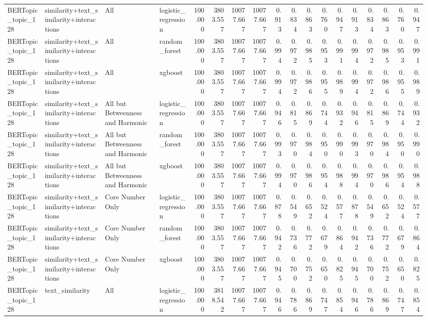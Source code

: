 \begin{tabular}{llllrrrrrrrrrrrrrr}
BERTopic_topic_128 & similarity+text_similarity+interactions & All & logistic_regression & 100.000 & 3803.557 & 10077.667 & 10077.667 & 0.913 & 0.834 & 0.863 & 0.760 & 0.947 & 0.913 & 0.834 & 0.863 & 0.760 & 0.947 \\
BERTopic_topic_128 & similarity+text_similarity+interactions & All & random_forest & 100.000 & 3803.557 & 10077.667 & 10077.667 & 0.994 & 0.972 & 0.985 & 0.953 & 0.991 & 0.994 & 0.972 & 0.985 & 0.953 & 0.991 \\
BERTopic_topic_128 & similarity+text_similarity+interactions & All & xgboost & 100.000 & 3803.557 & 10077.667 & 10077.667 & 0.994 & 0.972 & 0.986 & 0.955 & 0.989 & 0.994 & 0.972 & 0.986 & 0.955 & 0.989 \\
BERTopic_topic_128 & similarity+text_similarity+interactions & All but Betweenness and Harmonic & logistic_regression & 100.000 & 3803.557 & 10077.667 & 10077.667 & 0.946 & 0.815 & 0.869 & 0.744 & 0.932 & 0.946 & 0.815 & 0.869 & 0.744 & 0.932 \\
BERTopic_topic_128 & similarity+text_similarity+interactions & All but Betweenness and Harmonic & random_forest & 100.000 & 3803.557 & 10077.667 & 10077.667 & 0.993 & 0.970 & 0.984 & 0.950 & 0.990 & 0.993 & 0.970 & 0.984 & 0.950 & 0.990 \\
BERTopic_topic_128 & similarity+text_similarity+interactions & All but Betweenness and Harmonic & xgboost & 100.000 & 3803.557 & 10077.667 & 10077.667 & 0.994 & 0.970 & 0.986 & 0.954 & 0.988 & 0.994 & 0.970 & 0.986 & 0.954 & 0.988 \\
BERTopic_topic_128 & similarity+text_similarity+interactions & Core Number Only & logistic_regression & 100.000 & 3803.557 & 10077.667 & 10077.667 & 0.878 & 0.549 & 0.652 & 0.524 & 0.577 & 0.878 & 0.549 & 0.652 & 0.524 & 0.577 \\
BERTopic_topic_128 & similarity+text_similarity+interactions & Core Number Only & random_forest & 100.000 & 3803.557 & 10077.667 & 10077.667 & 0.942 & 0.736 & 0.772 & 0.679 & 0.864 & 0.942 & 0.736 & 0.772 & 0.679 & 0.864 \\
BERTopic_topic_128 & similarity+text_similarity+interactions & Core Number Only & xgboost & 100.000 & 3803.557 & 10077.667 & 10077.667 & 0.945 & 0.700 & 0.752 & 0.650 & 0.825 & 0.945 & 0.700 & 0.752 & 0.650 & 0.825 \\
BERTopic_topic_128 & text_similarity & All & logistic_regression & 100.000 & 3818.542 & 10077.667 & 10077.667 & 0.946 & 0.786 & 0.869 & 0.747 & 0.854 & 0.946 & 0.786 & 0.869 & 0.747 & 0.854 \\

\end{tabular}
